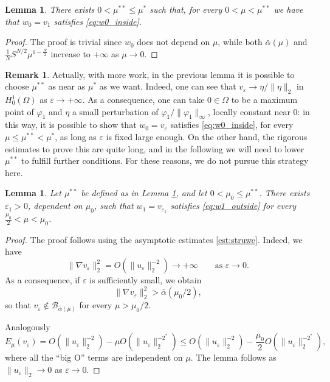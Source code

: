 \documentclass[10pt]{article}
\newcommand{\eps}{\varepsilon}
\newcommand{\Bcal}{{\mathcal{B}}}
\newtheorem{lemma}[proposition]{Lemma}
\theoremstyle{definition}
\newtheorem{remark}[proposition]{Remark}
\numberwithin{equation}{section}
\begin{document}
\begin{lemma}\label{lem:w0}
There exists $0<\mu^{**}\le \mu^*$ such that, for every $0<\mu<\mu^{**}$ we have that
$w_0=v_1$ satisfies \eqref{eq:w0_inside}.
\end{lemma}
%
\begin{proof}
The proof is trivial since $w_0$ does not depend on $\mu$, while both $\bar\alpha(\mu)$ and
$\frac{1}{N}S^{N/2}\mu^{1-\frac{N}{2}}$ increase to $+\infty$ as $\mu\to0$.
\end{proof}
%
\begin{remark}\label{rmk:better_w0}
Actually, with more work, in the previous lemma it is possible to choose $\mu^{**}$ as
near as $\mu^*$ as we want.
Indeed, one can see that $v_\eps\to \eta/\|\eta\|_2$ in $H^1_0(\Omega)$ as $\eps\to+\infty$.
As a consequence, one can take $0\in\Omega$ to be a maximum point of $\varphi_1$ and $\eta$ a small 
perturbation of $\varphi_1/\|\varphi_1\|_\infty$, locally constant near $0$: in this way, it is possible to show that $w_0=v_\eps$
satisfies \eqref{eq:w0_inside}, for every $\mu\leq \mu^{**}<\mu^*$, as long as $\eps$ is fixed
large enough. On the other hand, the rigorous estimates to prove this are quite long, and
in the following we will need to lower $\mu^{**}$ to fulfill further conditions. For these
reasons, we do not pursue this strategy here.
\end{remark}
%
\begin{lemma}\label{lem:w1}
Let $\mu^{**}$ be defined as in Lemma \ref{lem:w0}, and let $0<\mu_0\le \mu^{**}$. There
exists $\eps_1>0$, dependent on $\mu_0$, such that $w_1=v_{\eps_1}$ satisfies
\eqref{eq:w1_outside} for every $\frac{\mu_0}{2}<\mu<\mu_0$.
\end{lemma}
%
\begin{proof}
The proof follows using the asymptotic estimates \eqref{est:struwe}. Indeed, we have
\[
\|\nabla v_\eps\|_2^2 = O(\|u_\eps\|_2^{-2})\to+\infty \qquad\text{as }\eps\to0.
\]
As a consequence, if $\eps$ is sufficiently small, we obtain
\[
\|\nabla v_\eps\|_2^2 > \bar\alpha (\mu_0/2),
\]
so that $v_\eps \not \in \Bcal_{\bar \alpha (\mu)}$ for every $\mu>\mu_0/2$.

Analogously
\[
E_\mu(v_\eps) = O(\|u_\eps\|_2^{-2}) - \mu O(\|u_\eps\|_2^{-2^*})
\le O(\|u_\eps\|_2^{-2}) - \frac{\mu_0}{2} O(\|u_\eps\|_2^{-2^*}),
\]
where all the ``big O'' terms are independent on $\mu$. The lemma follows as $\|u_\eps\|_2\to0$ as $\eps\to0$.
\end{proof}
\end{document}
